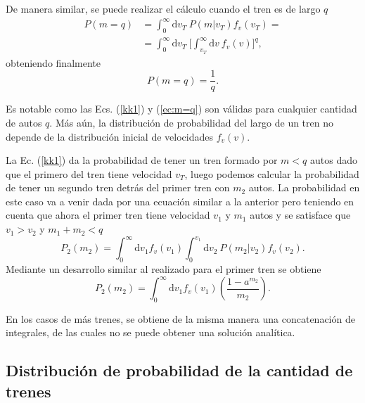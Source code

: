 \documentclass[letterpaper,12pt]{article}
\theoremstyle{plain}
\begin{document}
De manera similar, se puede realizar el cálculo cuando el tren es de largo $q$
\begin{align}
    P(m=q) &= \int_0^{\infty} \text{d}v_T ~ P(m|v_T) f_v(v_T) = \\    
    &=  \int_0^{\infty} \text{d} v_T ~ \biggr[ \int_{v_T}^{\infty}\text{d}v ~f_v(v)  \biggr]^{q}\text{,}
\end{align}
obteniendo finalmente
\begin{equation}
    P(m=q)= \frac{1}{q}.
    \label{ec:m=q}
\end{equation}

Es notable como las Ecs. (\ref{kk1}) y (\ref{ec:m=q}) son válidas para cualquier cantidad de autos $q$. Más aún, la distribución de probabilidad del largo de un tren no depende de la distribución inicial de velocidades $f_v(v)$. 

La Ec. (\ref{kk1}) da la probabilidad de tener un tren formado por $m<q$ autos dado que el primero del tren tiene velocidad $v_T$, luego podemos calcular la probabilidad de tener un segundo tren detrás del primer tren con $m_2$ autos. La probabilidad en este caso va a venir dada por una ecuación similar a la anterior pero teniendo en cuenta que ahora el primer tren tiene velocidad $v_1$ y $m_1$ autos y se satisface que $v_1 > v_2$ y $m_1 + m_2 < q$
\begin{equation}
    P_2(m_2) = \int_0^{\infty} \text{d}v_1 f_v(v_1) \int_0^{v_1} \text{d}v_2 ~ P(m_2|v_2) f_v(v_2).
\end{equation}
Mediante un desarrollo similar al realizado para el primer tren se obtiene
\begin{equation}
    P_2(m_2) = \int_0^{\infty} \text{d}v_1 f_v(v_1) \left(\frac{1-a^{m_2}}{m_2}\right)\text{.}
\end{equation}

En los casos de más trenes, se obtiene de la misma manera una concatenación de integrales, de las cuales no se puede obtener una solución analítica.

\subsection{Distribución de probabilidad de la cantidad de trenes}
\end{document}
